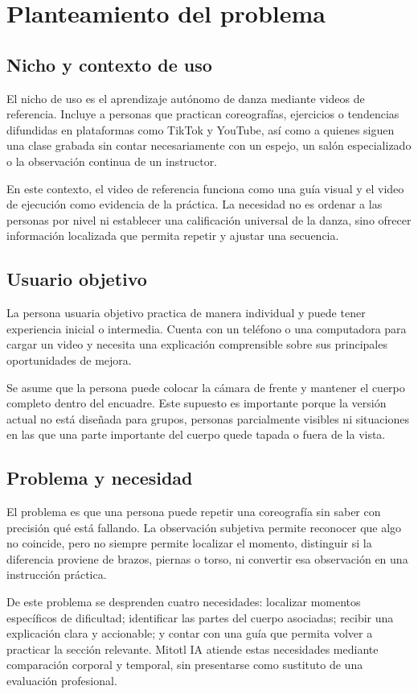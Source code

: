 \documentclass[12pt,a4paper]{article}
\begin{document}
\section{Planteamiento del problema}
\subsection{Nicho y contexto de uso}
El nicho de uso es el aprendizaje autónomo de danza mediante videos de referencia. Incluye a personas que practican coreografías, ejercicios o tendencias difundidas en plataformas como TikTok y YouTube, así como a quienes siguen una clase grabada sin contar necesariamente con un espejo, un salón especializado o la observación continua de un instructor.

En este contexto, el video de referencia funciona como una guía visual y el video de ejecución como evidencia de la práctica. La necesidad no es ordenar a las personas por nivel ni establecer una calificación universal de la danza, sino ofrecer información localizada que permita repetir y ajustar una secuencia.
\subsection{Usuario objetivo}
La persona usuaria objetivo practica de manera individual y puede tener experiencia inicial o intermedia. Cuenta con un teléfono o una computadora para cargar un video y necesita una explicación comprensible sobre sus principales oportunidades de mejora.

Se asume que la persona puede colocar la cámara de frente y mantener el cuerpo completo dentro del encuadre. Este supuesto es importante porque la versión actual no está diseñada para grupos, personas parcialmente visibles ni situaciones en las que una parte importante del cuerpo quede tapada o fuera de la vista.
\subsection{Problema y necesidad}
El problema es que una persona puede repetir una coreografía sin saber con precisión qué está fallando. La observación subjetiva permite reconocer que algo no coincide, pero no siempre permite localizar el momento, distinguir si la diferencia proviene de brazos, piernas o torso, ni convertir esa observación en una instrucción práctica.

De este problema se desprenden cuatro necesidades: localizar momentos específicos de dificultad; identificar las partes del cuerpo asociadas; recibir una explicación clara y accionable; y contar con una guía que permita volver a practicar la sección relevante. Mitotl IA atiende estas necesidades mediante comparación corporal y temporal, sin presentarse como sustituto de una evaluación profesional.
\end{document}
